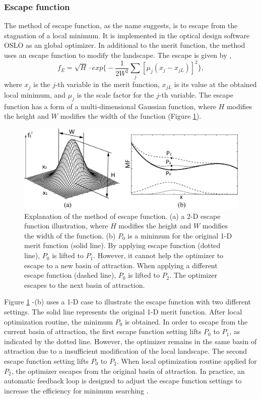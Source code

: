 \subsubsection{Escape function}
The method of escape function, as the name suggests, is to escape from the stagnation of a local minimum. It is implemented in the optical design software OSLO \cite{OsloSW} as an global optimizer. In additional to the merit function, the method uses an escape function to modify the landscape. The escape is given by \cite{Isshiki1998},
\begin{equation}
f_{E} = \sqrt{H} \cdot exp \Bigg\{ - \frac{1}{2W^{2}}\sum_{j} \left[\mu_{j}(x_j - x_{jL}) \right]^2 \Bigg\}, 
\end{equation}where $x_j$ is the $j$-th variable in the merit function, $x_{jL}$ is its value at the obtained local minimum, and $\mu_j$ is the scale factor for the $j$-th variable. The escape function has a form of a multi-dimensional Gaussian function, where $H$ modifies the height and $W$ modifies the width of the function (Figure \ref{fig: Escape_function_explained}). 
\begin{figure}
    \centering
    \includegraphics[scale=0.58]{chapter-1/figures/EscapeFunction_explained.png}
    \caption{Explanation of the method of escape function. (a) a 2-D escape function illustration, where $H$ modifies the height and $W$ modifies the width of the function. (b) $P_0$ is a minimum for the original 1-D merit function (solid line). By applying escape function (dotted line), $P_0$ is lifted to $P_1$. However, it cannot help the optimizer to escape to a new basin of attraction. When applying a different escape function (dashed line), $P_0$ is lifted to $P_2$. The optimizer escapes to the next basin of attraction.}
    \label{fig: Escape_function_explained}
\end{figure}
Figure \ref{fig: Escape_function_explained} -(b) uses a 1-D case to illustrate the escape function with two different settings. The solid line represents the original 1-D merit function. After local optimization routine, the minimum $P_0$ is obtained. In order to escape from the current basin of attraction, the first escape function setting lifts $P_0$ to $P_1$, as indicated by the dotted line. However, the optimizer remains in the same basin of attraction due to a insufficient modification of the local landscape. The second escape function setting lifts $P_0$ to $P_2$. When local optimization routine applied for $P_2$, the optimizer escapes from the original basin of attraction. In practice, an automatic feedback loop is designed to adjust the escape function settings to increase the efficiency for minimum searching \cite{Isshiki1998}.


